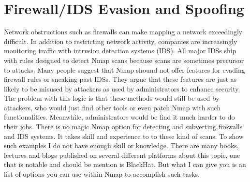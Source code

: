 \documentclass[times, utf8, seminar,english]{fer}
\begin{document}
\section{Firewall/IDS Evasion and Spoofing}
Network obstructions such as firewalls can make mapping a network exceedingly difficult. In addition to restricting network activity, companies are increasingly monitoring traffic with intrusion detection systems (IDS). All major IDSs ship with rules designed to detect Nmap scans because scans are sometimes precursor to attacks. Many people suggest that Nmap shound not offer features for evading firewall rules or sneaking past IDSs. They argue that these features are just as likely to be misused by attackers as used by administrators to enhance security. The problem with this logic is that these methods would still be used by attackers, who would just find other tools or even patch Nmap with such functionalities. Meanwhile, administrators would be find it much harder to do their jobs. There is no magic Nmap option for detecting and subverting firewalls and IDS systems. It takes skill and experience to to these kind of scans. To show such examples I do not have enough skill or knowledge. There are many books, lectures and blogs published on several different platforms about this topic, one that is notable and should be mention is BlackHat. But what I can give you is an list of options you can use within Nmap to accomplish such tasks.
\end{document}
